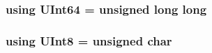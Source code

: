 \subsubsection[{U\-Int64}]{\setlength{\rightskip}{0pt plus 5cm}using {\bf U\-Int64} =  unsigned long long}\label{Global_8h_a8d0d1f82b652d35bdb01e8cf2b94722f}
\subsubsection[{U\-Int8}]{\setlength{\rightskip}{0pt plus 5cm}using {\bf U\-Int8} =  unsigned char}\label{Global_8h_a7242693d8e7fcc893cd86220cc65f7b7}
